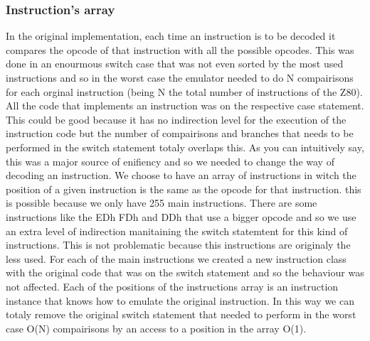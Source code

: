 \subsubsection{Instruction’s array}
In the original implementation, each time an instruction is to be decoded it compares the opcode of that instruction with all the possible opcodes. This was done in an enourmous switch case that was not even sorted by the most used instructions and so in the worst case the emulator needed to do N compairisons for each orginal instruction (being N the total number of instructions of the Z80). All the code that implements an instruction was on the respective case statement. This could be good because it has no indirection level for the execution of the instruction code but the number of compairisons and branches that needs to be performed in the switch statement totaly overlaps this. 
As you can intuitively say, this was a major source of enifiency and so we needed to change the way of decoding an instruction.
We choose to have an array of instructions in witch the position of a given instruction is the same as the opcode for that instruction. this is possible because we only have 255 main instructions. There are some instructions like the EDh FDh and DDh that use a bigger opcode and so we use an extra level of indirection manitaining the switch statemtent for this kind of instructions. This is not problematic because this instructions are originaly the less used.
For each of the main instructions we created a new instruction class with the original code that was on the switch statement and so the behaviour was not affected. Each of the positions of the instructions array is an instruction instance that knows how to emulate the original instruction.
In this way we can totaly remove the original switch statement that needed to perform in the worst case O(N) compairisons by an access to a position in the array O(1).




